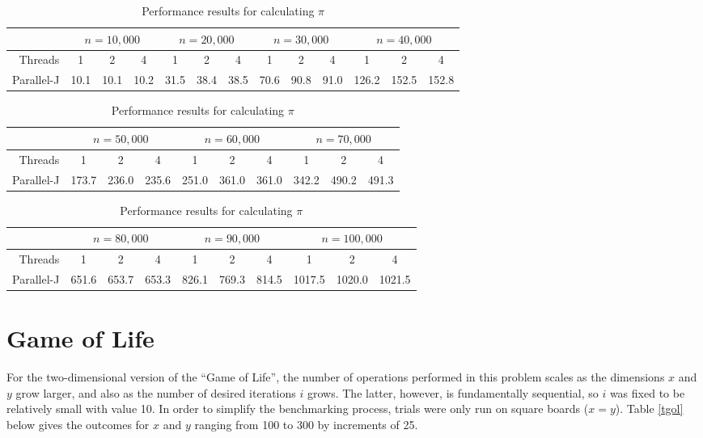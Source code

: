 \begin{table}[htbp]
\begin{tabular}{|r||c|c|c||c|c|c||c|c|c||c|c|c||}
	\hline
		& \multicolumn{3}{|c|}{$n=10,000$} & \multicolumn{3}{|c|}{$n=20,000$} & \multicolumn{3}{|c|}{$n=30,000$} & \multicolumn{3}{|c|}{$n=40,000$} \\
	\hline
		Threads & 1 & 2 & 4 & 1 & 2 & 4 & 1 & 2 & 4 & 1 & 2 & 4 \\
	\hline
	\hline
		Parallel-J & 10.1 & 10.1 & 10.2 & 31.5 & 38.4 & 38.5 & 70.6 & 90.8 & 91.0 & 126.2 & 152.5& 152.8 \\
	\hline
\end{tabular}

\begin{tabular}{|r|c|c|c||c|c|c||c|c|c||}
	\hline
		& \multicolumn{3}{|c||}{$n=50,000$} & \multicolumn{3}{|c|}{$n=60,000$} & \multicolumn{3}{|c|}{$n=70,000$} \\
	\hline
		Threads & 1 & 2 & 4 & 1 & 2 & 4 & 1 & 2 & 4 \\
	\hline
	\hline
		Parallel-J & 173.7 & 236.0 & 235.6 & 251.0 & 361.0 & 361.0 & 342.2 & 490.2 & 491.3 \\
	\hline
\end{tabular}

\begin{tabular}{|r|c|c|c||c|c|c||c|c|c||}
	\hline
		 & \multicolumn{3}{|c|}{$n=80,000$} & \multicolumn{3}{|c|}{$n=90,000$} & \multicolumn{3}{|c|}{$n=100,000$} \\
	\hline
		Threads & 1 & 2 & 4 & 1 & 2 & 4 & 1 & 2 & 4 \\
	\hline
	\hline
		Parallel-J & 651.6 & 653.7 & 653.3 & 826.1 & 769.3 & 814.5 & 1017.5 & 1020.0 & 1021.5 \\
	\hline
\end{tabular}
\caption{Performance results for calculating $\pi$}
\label{tnip}
\end{table}

\section{Game of Life}
For the two-dimensional version of the ``Game of Life'', 
the number of operations performed in this problem scales 
as the dimensions $x$ and $y$ grow larger, 
and also as the number of desired iterations $i$ grows. 
The latter, however, is fundamentally sequential, 
so $i$ was fixed to be relatively small with value 10.
In order to simplify the benchmarking process, 
trials were only run on square boards ($x=y$). 
Table \ref{tgol} below gives the outcomes for $x$ and $y$ 
ranging from 100 to 300 by increments of 25.

